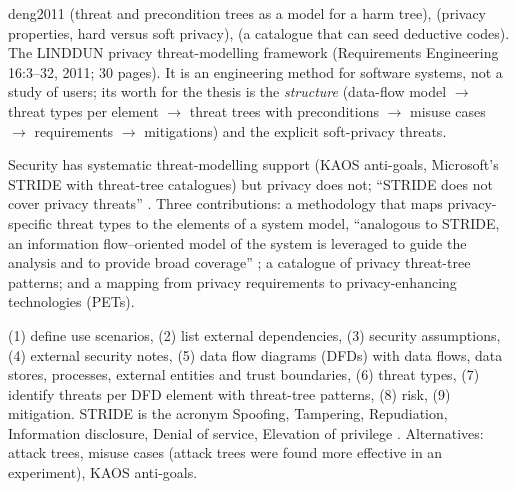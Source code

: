 \begin{papercard}{deng2011}
  (threat and precondition trees as a model for a harm tree),  (privacy properties, hard versus soft privacy),  (a catalogue that can seed deductive codes). The LINDDUN privacy threat-modelling framework (Requirements Engineering 16:3--32, 2011; 30 pages). It is an engineering method for software systems, not a study of users; its worth for the thesis is the \emph{structure} (data-flow model $\to$ threat types per element $\to$ threat trees with preconditions $\to$ misuse cases $\to$ requirements $\to$ mitigations) and the explicit soft-privacy threats.

 Security has systematic threat-modelling support (KAOS anti-goals, Microsoft's STRIDE with threat-tree catalogues) but privacy does not; ``STRIDE does not cover privacy threats'' . Three contributions: a methodology that maps privacy-specific threat types to the elements of a system model, ``analogous to STRIDE, an information flow--oriented model of the system is leveraged to guide the analysis and to provide broad coverage'' ; a catalogue of privacy threat-tree patterns; and a mapping from privacy requirements to privacy-enhancing technologies (PETs).

 (1) define use scenarios, (2) list external dependencies, (3) security assumptions, (4) external security notes, (5) data flow diagrams (DFDs) with data flows, data stores, processes, external entities and trust boundaries, (6) threat types, (7) identify threats per DFD element with threat-tree patterns, (8) risk, (9) mitigation. STRIDE is the acronym Spoofing, Tampering, Repudiation, Information disclosure, Denial of service, Elevation of privilege . Alternatives: attack trees, misuse cases (attack trees were found more effective in an experiment), KAOS anti-goals.


\end{papercard}
